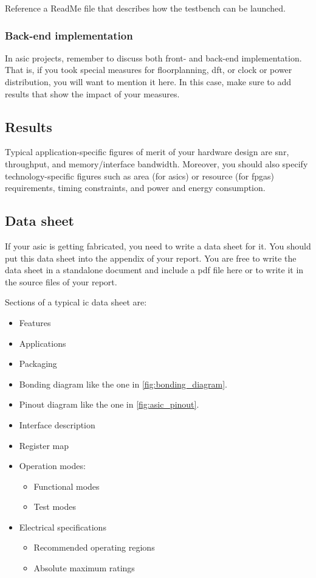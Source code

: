       Reference a ReadMe file that describes how the testbench can be launched.

    \subsubsection{Back-end implementation}

      In \gls{asic} projects, remember to discuss both front- and back-end implementation.
      That is, if you took special measures for floorplanning, \gls{dft}, or clock or power distribution, you will want to mention it here.
      In this case, make sure to add results that show the impact of your measures.

  \subsection{Results}

    Typical application-specific figures of merit of your hardware design are \gls{snr}, throughput, and memory/interface bandwidth.
    Moreover, you should also specify technology-specific figures such as area (for \glspl{asic}) or resource (for \glspl{fpga}) requirements, timing constraints, and power and energy consumption.

  \subsection{Data sheet}

    If your \gls{asic} is getting fabricated, you need to write a data sheet for it.
    You should put this data sheet into the appendix of your report.
    You are free to write the data sheet in a standalone document and include a \gls{pdf} file here or to write it in the source files of your report.

    Sections of a typical \gls{ic} data sheet are:
    \begin{itemize}
      \item Features
      \item Applications
      \item Packaging
      \item Bonding diagram like the one in \cref{fig:bonding_diagram}.
      \item Pinout diagram like the one in \cref{fig:asic_pinout}.
      \item Interface description
      \item Register map
      \item Operation modes:
      \begin{itemize}
        \item Functional modes
        \item Test modes
      \end{itemize}
      \item Electrical specifications
      \begin{itemize}
        \item Recommended operating regions
        \item Absolute maximum ratings
      \end{itemize}
    \end{itemize}

